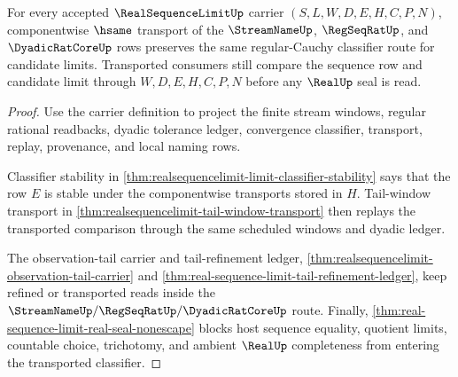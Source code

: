 \begin{theorem}\label{thm:realsequencelimit-regular-classifier-transport}
For every accepted $\RealSequenceLimitUp$ carrier $(S,L,W,D,E,H,C,P,N)$, componentwise $\hsame$ transport of the $\StreamNameUp$, $\RegSeqRatUp$, and $\DyadicRatCoreUp$ rows preserves the same regular-Cauchy classifier route for candidate limits. Transported consumers still compare the sequence row and candidate limit through $W,D,E,H,C,P,N$ before any $\RealUp$ seal is read.
\end{theorem}
\begin{proof}
Use the carrier definition to project the finite stream windows, regular rational readbacks, dyadic tolerance ledger, convergence classifier, transport, replay, provenance, and local naming rows.

Classifier stability in \autoref{thm:realsequencelimit-limit-classifier-stability} says that the row $E$ is stable under the componentwise transports stored in $H$. Tail-window transport in \autoref{thm:realsequencelimit-tail-window-transport} then replays the transported comparison through the same scheduled windows and dyadic ledger.

The observation-tail carrier and tail-refinement ledger, \autoref{thm:realsequencelimit-observation-tail-carrier} and \autoref{thm:real-sequence-limit-tail-refinement-ledger}, keep refined or transported reads inside the $\StreamNameUp/\RegSeqRatUp/\DyadicRatCoreUp$ route. Finally, \autoref{thm:real-sequence-limit-real-seal-nonescape} blocks host sequence equality, quotient limits, countable choice, trichotomy, and ambient $\RealUp$ completeness from entering the transported classifier.
\end{proof}

